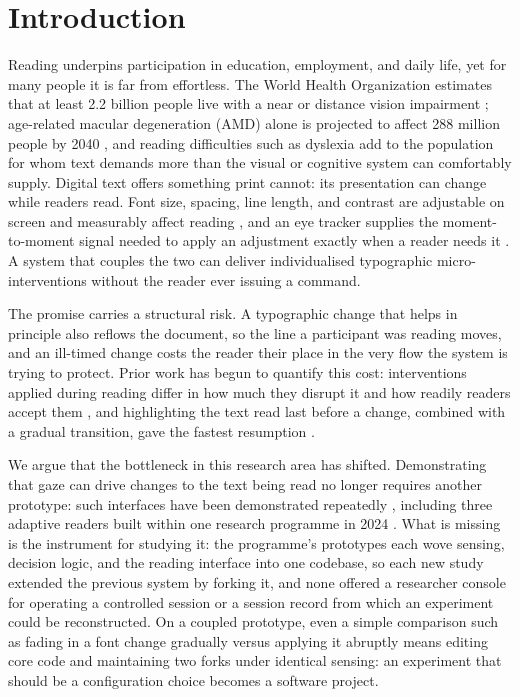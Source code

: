 \section{Introduction}
\label{sec:intro}

Reading underpins participation in education, employment, and daily life, yet for many people it is far from effortless.
The World Health Organization estimates that at least 2.2 billion people live with a near or distance vision impairment \cite{who2026vision}; age-related macular degeneration (AMD) alone is projected to affect 288 million people by 2040 \cite{wong2014amd}, and reading difficulties such as dyslexia \cite{peterson2012dyslexia} add to the population for whom text demands more than the visual or cognitive system can comfortably supply.
Digital text offers something print cannot: its presentation can change while readers read.
Font size, spacing, line length, and contrast are adjustable on screen and measurably affect reading \cite{rello2016makeitbig, beymer2008eyetracking, beier2021letterspacing, dyson2004layout, rubin1989contrast}, and an eye tracker supplies the moment-to-moment signal needed to apply an adjustment exactly when a reader needs it \cite{rayner1998eyemovements}.
A system that couples the two can deliver individualised typographic micro-interventions \cite{persson2025microintervention} without the reader ever issuing a command.

The promise carries a structural risk.
A typographic change that helps in principle also reflows the document, so the line a participant was reading moves, and an ill-timed change costs the reader their place in the very flow the system is trying to protect.
Prior work has begun to quantify this cost: interventions applied during reading differ in how much they disrupt it and how readily readers accept them \cite{pereira2024typography}, and highlighting the text read last before a change, combined with a gradual transition, gave the fastest resumption \cite{jensen2025context}.

We argue that the bottleneck in this research area has shifted.
Demonstrating that gaze can drive changes to the text being read no longer requires another prototype: such interfaces have been demonstrated repeatedly \cite{biedert2010eyebook, medan2024newline, rummens2026highlighting, jensen2025context}, including three adaptive readers built within one research programme in 2024 \cite{refsgaard2024rtr, pereira2024typography, palinec2024reactive}.
What is missing is the instrument for studying it: the programme's prototypes each wove sensing, decision logic, and the reading interface into one codebase, so each new study extended the previous system by forking it, and none offered a researcher console for operating a controlled session or a session record from which an experiment could be reconstructed.
On a coupled prototype, even a simple comparison such as fading in a font change gradually versus applying it abruptly means editing core code and maintaining two forks under identical sensing: an experiment that should be a configuration choice becomes a software project.

